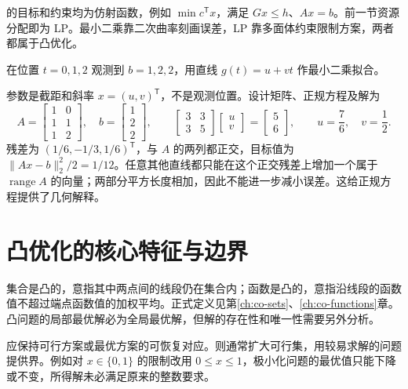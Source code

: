 \documentclass[UTF8,12pt,a4paper,fontset=fandol]{ctexbook}
\begin{document}
的目标和约束均为仿射函数，例如 $\min c^{\mathsf T}x$，满足 $Gx\leq h$、$Ax=b$。前一节资源分配即为 LP。最小二乘靠二次曲率刻画误差，LP 靠多面体约束限制方案，两者都属于凸优化。

\begin{example}[一条拟合直线的完整计算]
在位置 $t=0,1,2$ 观测到 $b=1,2,2$，用直线 $g(t)=u+vt$ 作最小二乘拟合。
\end{example}
\begin{solve}
参数是截距和斜率 $x=(u,v)^{\mathsf T}$，不是观测位置。设计矩阵、正规方程及解为
\[
 A=\begin{bmatrix}1&0\\1&1\\1&2\end{bmatrix},\quad
 b=\begin{bmatrix}1\\2\\2\end{bmatrix},\qquad
 \begin{bmatrix}3&3\\3&5\end{bmatrix}
 \begin{bmatrix}u\\v\end{bmatrix}
 =\begin{bmatrix}5\\6\end{bmatrix},\qquad
 u=\frac76,\quad v=\frac12.
\]
残差为 $(1/6,-1/3,1/6)^{\mathsf T}$，与 $A$ 的两列都正交，目标值为 $\|Ax-b\|_2^2/2=1/12$。任意其他直线都只能在这个正交残差上增加一个属于 $\operatorname{range}A$ 的向量；两部分平方长度相加，因此不能进一步减小误差。这给正规方程提供了几何解释。
\end{solve}

\section{凸优化的核心特征与边界}

集合是凸的，意指其中两点间的线段仍在集合内；函数是凸的，意指沿线段的函数值不超过端点函数值的加权平均。正式定义见第\ref{ch:co-sets}、\ref{ch:co-functions}章。凸问题的局部最优解必为全局最优解，但解的存在性和唯一性需要另外分析。

应保持可行方案或最优方案的可恢复对应。则通常扩大可行集，用较易求解的问题提供界。例如对 $x\in\{0,1\}$ 的限制改用 $0\leq x\leq1$，极小化问题的最优值只能下降或不变，所得解未必满足原来的整数要求。
\end{document}
